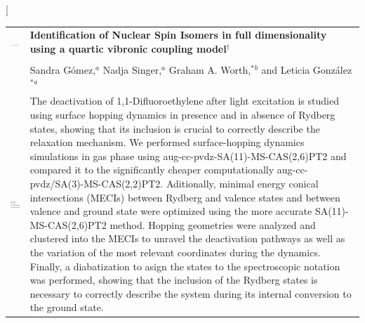 \documentclass[twoside,twocolumn,9pt]{article}
\begin{document}
\twocolumn[
  \begin{@twocolumnfalse}
\vspace{3cm}
\sffamily
\begin{tabular}{m{4.5cm} p{13.5cm} }

\includegraphics{head_foot/DOI} & \noindent\LARGE{\textbf{Identification of Nuclear Spin Isomers in full dimensionality using a quartic vibronic coupling model$^\dag$}} \\%
\vspace{0.3cm} & \vspace{0.3cm} \\

 & \noindent\large{Sandra G\'omez,\textit{$^{a}$} Nadja Singer,\textit{$^{a}$} Graham A. Worth,$^{\ast}$\textit{$^{b}$} and Leticia Gonz\'alez$^{\ast}$\textit{$^{a}$}} \\%
\includegraphics{head_foot/dates} & \noindent\normalsize{The deactivation of 1,1-Difluoroethylene after light excitation is studied using surface hopping dynamics in presence and in absence of Rydberg states, showing that its inclusion is crucial to correctly describe the relaxation mechanism. We performed surface-hopping dynamics simulations in gas phase using aug-cc-pvdz-SA(11)-MS-CAS(2,6)PT2  and compared it to the significantly cheaper computationally aug-cc-pvdz/SA(3)-MS-CAS(2,2)PT2. Aditionally, minimal energy conical intersections (MECIs) between Rydberg and valence states and between valence and ground state were optimized using the more accurate SA(11)-MS-CAS(2,6)PT2 method. Hopping geometries were analyzed and clustered into the MECIs to unravel the deactivation pathways as well as the variation of the most relevant coordinates during the dynamics. Finally, a diabatization to asign the states to the spectroscopic notation was performed, showing that the inclusion of the Rydberg states is necessary to correctly describe the system during its internal conversion to the ground state.} \\
\end{tabular}

 \end{@twocolumnfalse} \vspace{0.6cm}
\end{document}
